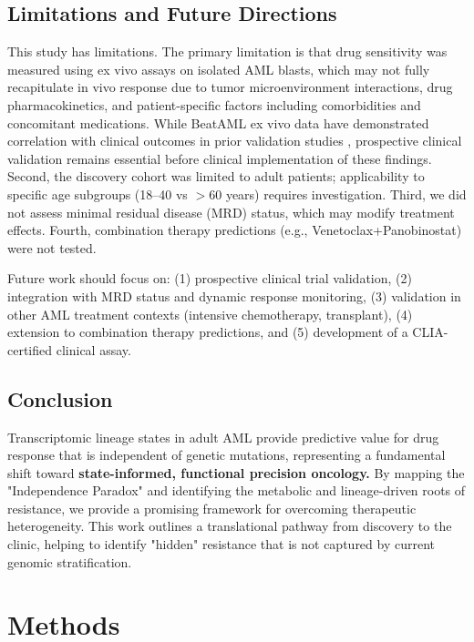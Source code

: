 \documentclass[11pt,a4paper]{article}
\begin{document}
\subsection{Limitations and Future Directions}

This study has limitations. The primary limitation is that drug sensitivity was measured using ex vivo assays on isolated AML blasts, which may not fully recapitulate in vivo response due to tumor microenvironment interactions, drug pharmacokinetics, and patient-specific factors including comorbidities and concomitant medications. While BeatAML ex vivo data have demonstrated correlation with clinical outcomes in prior validation studies \cite{tyner2018beataml}, prospective clinical validation remains essential before clinical implementation of these findings. Second, the discovery cohort was limited to adult patients; applicability to specific age subgroups (18--40 vs $>$60 years) requires investigation. Third, we did not assess minimal residual disease (MRD) status, which may modify treatment effects. Fourth, combination therapy predictions (e.g., Venetoclax+Panobinostat) were not tested.

Future work should focus on: (1) prospective clinical trial validation, (2) integration with MRD status and dynamic response monitoring, (3) validation in other AML treatment contexts (intensive chemotherapy, transplant), (4) extension to combination therapy predictions, and (5) development of a CLIA-certified clinical assay.

\subsection{Conclusion}

Transcriptomic lineage states in adult AML provide predictive value for drug response that is independent of genetic mutations, representing a fundamental shift toward \textbf{state-informed, functional precision oncology.} By mapping the "Independence Paradox" and identifying the metabolic and lineage-driven roots of resistance, we provide a promising framework for overcoming therapeutic heterogeneity. This work outlines a translational pathway from discovery to the clinic, helping to identify "hidden" resistance that is not captured by current genomic stratification.

\section{Methods}
\end{document}
